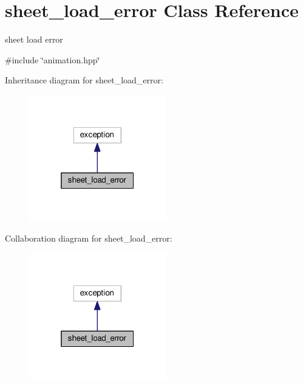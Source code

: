 \hypertarget{classsheet__load__error}{}\section{sheet\+\_\+load\+\_\+error Class Reference}
\label{classsheet__load__error}


sheet load error  




{\ttfamily \#include \char`\"{}animation.\+hpp\char`\"{}}



Inheritance diagram for sheet\+\_\+load\+\_\+error\+:\nopagebreak
\begin{figure}[H]
\begin{center}
\leavevmode
\includegraphics[width=169pt]{classsheet__load__error__inherit__graph}
\end{center}
\end{figure}


Collaboration diagram for sheet\+\_\+load\+\_\+error\+:\nopagebreak
\begin{figure}[H]
\begin{center}
\leavevmode
\includegraphics[width=169pt]{classsheet__load__error__coll__graph}
\end{center}
\end{figure}
